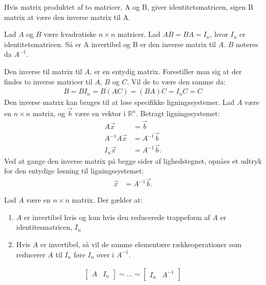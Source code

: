 Hvis matrix produktet af to matricer, A og B, giver identitetsmatricen, sigen B matrix at være den inverse matrix til A. 
\begin{defn}
Lad $A$ og $B$ være kvadratiske $n \times n$ matricer. Lad $AB=BA=I_n$, hvor $I_n$ er identitetsmatricen. Så er A invertibel og B er den inverse matrix til $A$. $B$ noteres da $A^{-1}$. 
\label{def(inversmatrix)}
\end{defn}
Den inverse til matrix til $A$, er en entydig matrix. Forestiller man sig at der findes to inverse matricer til $A$, $B$ og $C$. Vil de to være den samme da: 
\begin{align*}
B=BI_n=B(AC)=(BA)C=I_nC=C
\end{align*}
Den inverse matrix kan bruges til at løse specifikke ligningssystemer. Lad $A$ være en $n \times n$ matrix, og $\vec{b}$ være en vektor i $\mathds{R}^n$. Betragt ligningssystemet: 
\begin{align*}
A \vec{x} &= \vec{b}\\
A^{-1} A \vec{x} &= A^{-1} \vec{b}\\
I_n \vec{x} &= A^{-1} \vec{b}.
\end{align*} 
Ved at gange den inverse matrix på begge sider af lighedstegnet, opnåes et udtryk for den entydige løsning til ligningssystemet: 
\begin{align}
\vec{x} &= A^{-1} \vec{b}.
\end{align} 

\begin{stn}
Lad $A$ være en $n \times n$ matrix. Der gælder at: 
\begin{enumerate}[label=(\alph*)]
\item $A$ er invertibel hvis og kun hvis den reducerede trappeform af $A$ er identitesmatricen, $I_n$
\item Hvis $A$ er invertibel, så vil de samme elementære rækkeoperationer som reducerer $A$ til $I_n$ føre $I_n$ over i $A^{-1}$.  
\end{enumerate}
\begin{align*}
\begin{bmatrix}
A & I_n
\end{bmatrix} \sim \dots \sim
\begin{bmatrix}
I_n & A^{-1}
\end{bmatrix}
\end{align*}
\label{stn:inversmatrix}
\end{stn}

